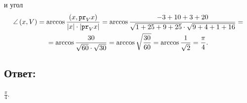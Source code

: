 \documentclass[12pt]{article}
\begin{document}
    и угол
    \begin{multline*}
        \angle \left ( x, V \right )
        = \arccos \frac{\left ( x, \texttt{pr}_{V} {x} \right )}{\left | x \right | \cdot \left | \texttt{pr}_{V} {x} \right |}
        = \arccos \frac{-3 + 10 + 3 + 20}{\sqrt{1 + 25 + 9 + 25} \cdot \sqrt{9 + 4 + 1 + 16}} = \\
        = \arccos \frac{30}{\sqrt{60} \cdot \sqrt{30}}
        = \arccos \sqrt{\frac{30}{60}}
        = \arccos \frac{1}{\sqrt{2}}
        = \frac{\pi}{4} .
    \end{multline*}

    \subsection*{Ответ:}
    $\frac{\pi}{4}$.
\end{document}
